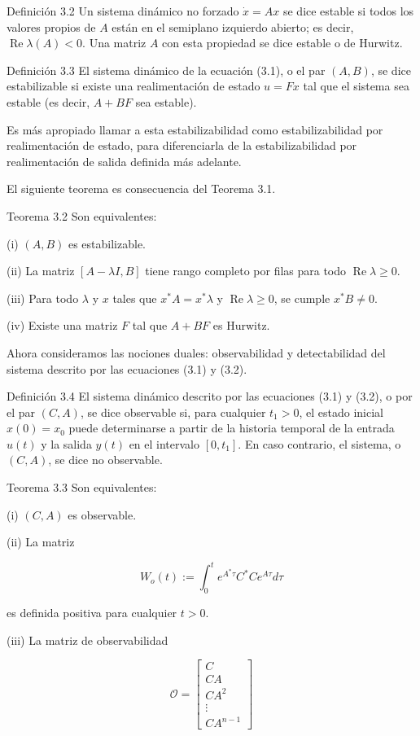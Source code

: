 Definición 3.2 Un sistema dinámico no forzado $\dot{x}=A x$ se dice estable si todos los valores propios de $A$ están en el semiplano izquierdo abierto; es decir, $\operatorname{Re} \lambda(A)<0$. Una matriz $A$ con esta propiedad se dice estable o de Hurwitz.

Definición 3.3 El sistema dinámico de la ecuación (3.1), o el par $(A, B)$, se dice estabilizable si existe una realimentación de estado $u=F x$ tal que el sistema sea estable (es decir, $A+B F$ sea estable).

Es más apropiado llamar a esta estabilizabilidad como estabilizabilidad por realimentación de estado, para diferenciarla de la estabilizabilidad por realimentación de salida definida más adelante.

El siguiente teorema es consecuencia del Teorema 3.1.

Teorema 3.2 Son equivalentes:

(i) $(A, B)$ es estabilizable.

(ii) La matriz $[A-\lambda I, B]$ tiene rango completo por filas para todo $\operatorname{Re} \lambda \geq 0$.

(iii) Para todo $\lambda$ y $x$ tales que $x^{*} A=x^{*} \lambda$ y $\operatorname{Re} \lambda \geq 0$, se cumple $x^{*} B \neq 0$.

(iv) Existe una matriz $F$ tal que $A+B F$ es Hurwitz.

Ahora consideramos las nociones duales: observabilidad y detectabilidad del sistema descrito por las ecuaciones (3.1) y (3.2).

Definición 3.4 El sistema dinámico descrito por las ecuaciones (3.1) y (3.2), o por el par $(C, A)$, se dice observable si, para cualquier $t_{1}>0$, el estado inicial $x(0)=x_{0}$ puede determinarse a partir de la historia temporal de la entrada $u(t)$ y la salida $y(t)$ en el intervalo $\left[0, t_{1}\right]$. En caso contrario, el sistema, o $(C, A)$, se dice no observable.

Teorema 3.3 Son equivalentes:

(i) $(C, A)$ es observable.

(ii) La matriz

$$
W_{o}(t):=\int_{0}^{t} e^{A^{*} \tau} C^{*} C e^{A \tau} d \tau
$$

es definida positiva para cualquier $t>0$.

(iii) La matriz de observabilidad

$$
\mathcal{O}=\left[\begin{array}{c}
C \\
C A \\
C A^{2} \\
\vdots \\
C A^{n-1}
\end{array}\right]
$$

